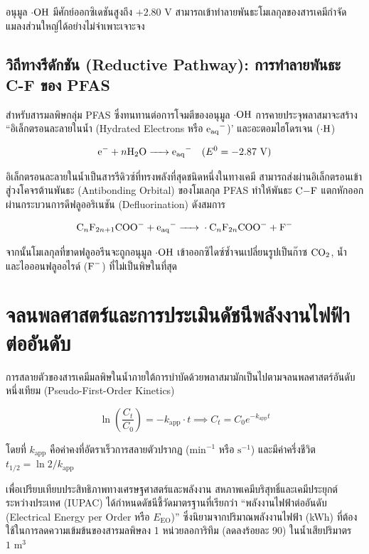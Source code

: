 อนุมูล $\cdot\ce{OH}$ มีศักย์ออกซิเดชันสูงถึง $+2.80 \text{ V}$ สามารถเข้าทำลายพันธะโมเลกุลของสารเคมีกำจัดแมลงส่วนใหญ่ได้อย่างไม่จำเพาะเจาะจง

\subsection{วิถีทางรีดักชัน (Reductive Pathway): การทำลายพันธะ C-F ของ PFAS}
สำหรับสารมลพิษกลุ่ม PFAS ซึ่งทนทานต่อการโจมตีของอนุมูล $\cdot\ce{OH}$ การคายประจุพลาสมาจะสร้าง ``อิเล็กตรอนละลายในน้ำ (Hydrated Electrons หรือ $\ce{e_{aq}^-}$)' และอะตอมไฮโดรเจน ($\cdot\ce{H}$)

\begin{equation}
    \ce{e- + } n\ce{H2O -> e_{aq}^-} \quad (E^0 = -2.87 \text{ V})
    \label{eq:hydrated_electron}
\end{equation}

อิเล็กตรอนละลายในน้ำเป็นสารรีดิวซ์ที่ทรงพลังที่สุดชนิดหนึ่งในทางเคมี สามารถส่งผ่านอิเล็กตรอนเข้าสู่วงโคจรต้านพันธะ (Antibonding Orbital) ของโมเลกุล PFAS ทำให้พันธะ $\ce{C-F}$ แตกหักออกผ่านกระบวนการดีฟลูออริเนชัน (Defluorination) ดังสมการ

\begin{equation}
    \ce{C_nF_{2n+1}COO- + e_{aq}^- -> \cdot C_nF_{2n}COO- + F-}
    \label{eq:defluorination}
\end{equation}

จากนั้นโมเลกุลที่ขาดฟลูออรีนจะถูกอนุมูล $\cdot\ce{OH}$ เข้าออกซิไดซ์ซ้ำจนเปลี่ยนรูปเป็นก๊าซ $\ce{CO2}$, น้ำ และไอออนฟลูออไรด์ ($\ce{F-}$) ที่ไม่เป็นพิษในที่สุด

\section{จลนพลศาสตร์และการประเมินดัชนีพลังงานไฟฟ้าต่ออันดับ}

การสลายตัวของสารเคมีมลพิษในน้ำภายใต้การบำบัดด้วยพลาสมามักเป็นไปตามจลนพลศาสตร์อันดับหนึ่งเทียม (Pseudo-First-Order Kinetics)

\begin{equation}
    \ln \left( \frac{C_t}{C_0} \right) = -k_{\text{app}} \cdot t \implies C_t = C_0 e^{-k_{\text{app}} t}
    \label{eq:pseudo_first_order}
\end{equation}

โดยที่ $k_{\text{app}}$ คือค่าคงที่อัตราเร็วการสลายตัวปรากฏ ($\text{min}^{-1}$ หรือ $\text{s}^{-1}$) และมีค่าครึ่งชีวิต $t_{1/2} = \ln 2 / k_{\text{app}}$

เพื่อเปรียบเทียบประสิทธิภาพทางเศรษฐศาสตร์และพลังงาน สหภาพเคมีบริสุทธิ์และเคมีประยุกต์ระหว่างประเทศ (IUPAC) ได้กำหนดดัชนีชี้วัดมาตรฐานที่เรียกว่า ``พลังงานไฟฟ้าต่ออันดับ (Electrical Energy per Order หรือ $E_{\text{EO}}$)'' ซึ่งนิยามจากปริมาณพลังงานไฟฟ้า (kWh) ที่ต้องใช้ในการลดความเข้มข้นของสารมลพิษลง 1 หน่วยลอการิทึม (ลดลงร้อยละ 90) ในน้ำเสียปริมาตร $1 \text{ m}^3$

